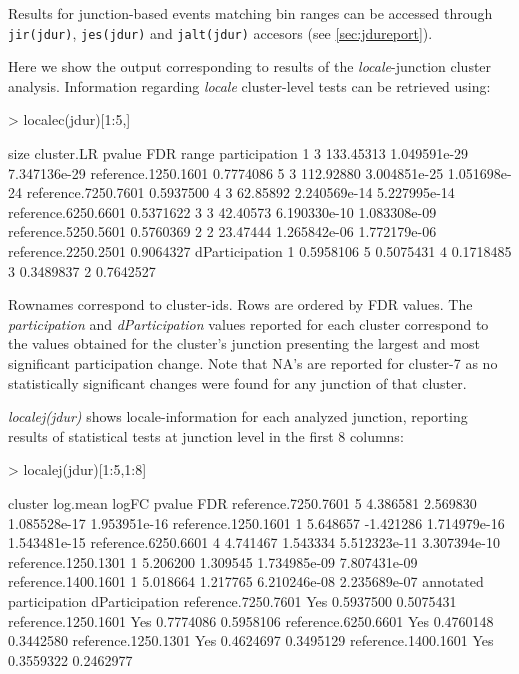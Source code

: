 \documentclass{article}
\begin{document}
Results for junction-based events matching bin ranges can be accessed through \texttt{jir(jdur)}, \texttt{jes(jdur)} and \texttt{jalt(jdur)} accesors (see \ref{sec:jdureport}).

Here we show the output corresponding to results of the {\em locale}-junction cluster analysis.
Information regarding {\em locale} cluster-level tests can be retrieved using:

\begin{Schunk}
\begin{Sinput}
> localec(jdur)[1:5,]
\end{Sinput}
\begin{Soutput}
  size cluster.LR       pvalue          FDR               range participation
1    3  133.45313 1.049591e-29 7.347136e-29 reference.1250.1601     0.7774086
5    3  112.92880 3.004851e-25 1.051698e-24 reference.7250.7601     0.5937500
4    3   62.85892 2.240569e-14 5.227995e-14 reference.6250.6601     0.5371622
3    3   42.40573 6.190330e-10 1.083308e-09 reference.5250.5601     0.5760369
2    2   23.47444 1.265842e-06 1.772179e-06 reference.2250.2501     0.9064327
  dParticipation
1      0.5958106
5      0.5075431
4      0.1718485
3      0.3489837
2      0.7642527
\end{Soutput}
\end{Schunk}

Rownames correspond to cluster-ids. Rows are ordered by FDR values. The {\em participation} and {\em dParticipation} values reported for each cluster correspond to the values obtained for the cluster's junction presenting the largest and most significant participation change. Note that NA's are reported for cluster-7 as no statistically significant changes were found for any junction of that cluster. 


{\em localej(jdur)} shows locale-information for each analyzed junction, reporting results of statistical tests at junction level in the first 8 columns:

\begin{Schunk}
\begin{Sinput}
> localej(jdur)[1:5,1:8]
\end{Sinput}
\begin{Soutput}
                    cluster log.mean     logFC       pvalue          FDR
reference.7250.7601       5 4.386581  2.569830 1.085528e-17 1.953951e-16
reference.1250.1601       1 5.648657 -1.421286 1.714979e-16 1.543481e-15
reference.6250.6601       4 4.741467  1.543334 5.512323e-11 3.307394e-10
reference.1250.1301       1 5.206200  1.309545 1.734985e-09 7.807431e-09
reference.1400.1601       1 5.018664  1.217765 6.210246e-08 2.235689e-07
                    annotated participation dParticipation
reference.7250.7601       Yes     0.5937500      0.5075431
reference.1250.1601       Yes     0.7774086      0.5958106
reference.6250.6601       Yes     0.4760148      0.3442580
reference.1250.1301       Yes     0.4624697      0.3495129
reference.1400.1601       Yes     0.3559322      0.2462977
\end{Soutput}
\end{Schunk}
\end{document}
